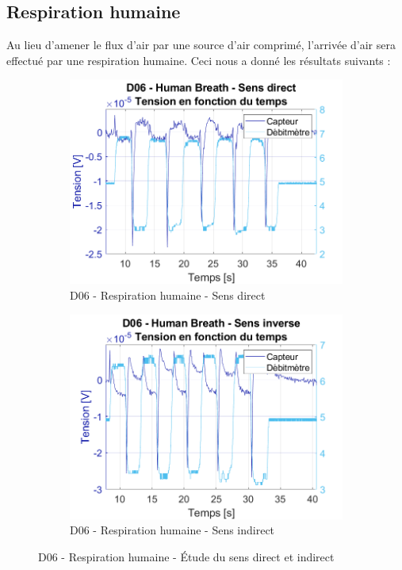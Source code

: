 \subsection{Respiration humaine}
Au lieu d'amener le flux d'air par une source d'air comprimé, l'arrivée d'air sera effectué par une respiration humaine. Ceci nous a donné les résultats suivants :

\begin{figure}[H]
    \hspace{-0.5cm}
    \begin{subfigure}{0.45\textwidth}
        \includegraphics[scale = 0.45]{assets/figures/D06_hb_direct.png}
        \caption{D06 - Respiration humaine - Sens direct}
        \label{fig:d06_hb_direct}
    \end{subfigure}
    \hspace{0.7cm}
    \begin{subfigure}{0.45\textwidth}
        \includegraphics[scale = 0.45]{assets/figures/D06_hb_indirect.png}
        \caption{D06 - Respiration humaine - Sens indirect}
        \label{fig:d06_hb_indirect}
    \end{subfigure}
    \caption{D06 - Respiration humaine - Étude du sens direct et indirect}
\end{figure}
